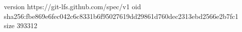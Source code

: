 version https://git-lfs.github.com/spec/v1
oid sha256:fbe869e6fec042c6c8331b6f95027619dd29861d760dec2313ebd2566e2b7fc1
size 393312
